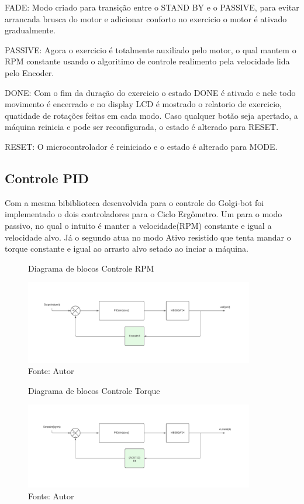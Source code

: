 \documentclass[../poliXuniversity_hospital_(USP)_report.tex]{subfiles}
\begin{document}
 FADE: Modo criado para transição entre o STAND BY e o PASSIVE, para evitar arrancada brusca do motor e adicionar conforto no exercicio o motor é ativado gradualmente.
 
 PASSIVE: Agora o exercicio é totalmente auxiliado pelo motor, o qual mantem o RPM constante usando o algoritimo de controle realimento pela velocidade lida pelo Encoder.
 
 DONE: Com o fim da duração do exercicio o estado DONE é ativado e nele todo movimento é encerrado e no display LCD é mostrado o relatorio de exercicio, quatidade de rotações feitas em cada modo. Caso qualquer botão seja apertado, a máquina reinicia e pode ser reconfigurada, o estado é alterado para RESET.
 
 RESET: O microcontrolador é reiniciado e o estado é alterado para MODE.

\subsection{Controle PID}
Com a mesma bibiblioteca desenvolvida para o controle do Golgi-bot foi implementado o dois controladores para o Ciclo Ergômetro. Um para o modo passivo, no qual o intuito é manter a velocidade(RPM) constante e igual a velocidade alvo. Já o segundo atua no modo Ativo resistido que tenta mandar o torque constante e igual ao arrasto alvo setado ao inciar a máquina. 


\begin{figure}[h]
\centering
     \caption{Diagrama de blocos Controle RPM}
        \centering %
        \includegraphics[width=10cm]{images/Diagrama de blocos RPM.pdf}
        \caption*{Fonte: Autor}
        \label{figura: Diagrama de blocos Controle RPM}
\end{figure}

\begin{figure}[h]
\centering
    \caption{Diagrama de blocos Controle Torque}
        \centering %
        \includegraphics[width=10cm]{images/Diagrama de blocos Torque.pdf}
        \caption*{Fonte: Autor}
        \label{figura: Diagrama de blocos Controle em Z}
\end{figure}
\end{document}
